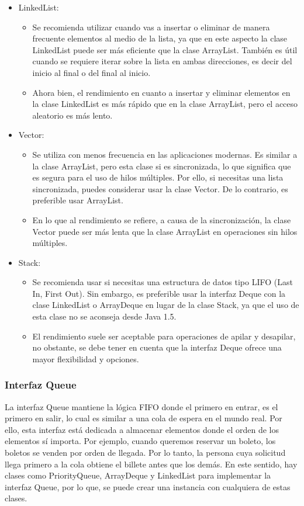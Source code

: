 \documentclass{report}
\begin{document}
\begin{itemize}
    \item LinkedList:
    \begin{itemize}
    \item Se recomienda utilizar cuando vas a insertar o eliminar de manera frecuente elementos al medio de la lista, ya que en este aspecto la clase LinkedList puede ser más eficiente que la clase ArrayList. También es útil cuando se requiere iterar sobre la lista en ambas direcciones, es decir del inicio al final o del final al inicio.
    \item Ahora bien, el rendimiento en cuanto a insertar y eliminar elementos en la clase LinkedList es más rápido que en la clase ArrayList, pero el acceso aleatorio es más lento.
        \end{itemize}
    \item Vector:
    \begin{itemize}
    \item Se utiliza con menos frecuencia en las aplicaciones modernas. Es similar a la clase ArrayList, pero esta clase si es sincronizada, lo que significa que es segura para el uso de hilos múltiples. Por ello, si necesitas una lista sincronizada, puedes considerar usar la clase Vector. De lo contrario, es preferible usar ArrayList.
    \item En lo que al rendimiento se refiere, a causa de la sincronización, la clase 
    Vector puede ser más lenta que la clase ArrayList en operaciones sin hilos múltiples.
      \end{itemize}
    \item Stack:
    \begin{itemize}
    \item Se recomienda usar si necesitas una estructura de datos tipo LIFO (Last In, First Out). Sin embargo, es preferible usar la interfaz Deque con la clase LinkedList o ArrayDeque en lugar de la clase Stack, ya que el uso de esta clase no se aconseja desde Java 1.5.
    
    \item El rendimiento suele ser aceptable para operaciones de apilar y desapilar, no obstante, se debe tener en cuenta que la interfaz Deque ofrece una mayor flexibilidad y opciones.
      \end{itemize}
\end{itemize}
\subsubsection{Interfaz Queue}
La interfaz Queue mantiene la lógica FIFO donde el primero en entrar, es el primero en salir, lo cual es similar a una cola de espera en el mundo real. Por ello, esta interfaz está dedicada a almacenar elementos donde el orden de los elementos sí importa. Por ejemplo, cuando queremos reservar un boleto, los boletos se venden por orden de llegada. Por lo tanto, la persona cuya solicitud llega primero a la cola obtiene el billete antes que los demás. En este sentido, hay clases como PriorityQueue, ArrayDeque y LinkedList para implementar la interfaz Queue, por lo que, se puede crear una instancia con cualquiera de estas clases.
\end{document}
